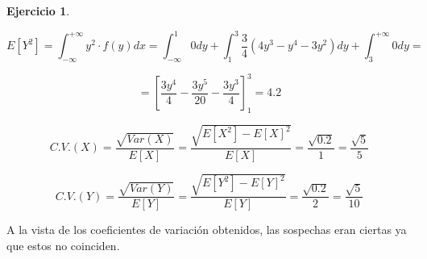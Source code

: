 \documentclass[a4paper, 12pt]{article}
\theoremstyle{definition}
\newtheorem{ej}{Ejercicio}
\begin{document}
\begin{ej}
\begin{enumerate}
    \begin{equation*}
        E[Y^2] = \int_{-\infty}^{+\infty}y^2 \cdot f(y)dx = \int_{-\infty}^{1}0dy + \int_{1}^{3}\frac{3}{4} (4y^3-y^4-3y^2)dy + \int_{3}^{+\infty}0dy =
    \end{equation*}
    
    \begin{equation*}
        = \left[\frac{3y^4}{4}-\frac{3y^5}{20}-\frac{3y^3}{4}\right]^{3}_{1} = 4.2
    \end{equation*}
    
    \begin{equation*}
        C.V.(X)=\frac{\sqrt{Var(X)}}{E[X]} = \frac{\sqrt{E[X^2]-E[X]^2}}{E[X]} = \frac{\sqrt{0.2}}{1} = \frac{\sqrt{5}}{5}
    \end{equation*}
    
    \begin{equation*}
        C.V.(Y)=\frac{\sqrt{Var(Y)}}{E[Y]} = \frac{\sqrt{E[Y^2]-E[Y]^2}}{E[Y]} = \frac{\sqrt{0.2}}{2} = \frac{\sqrt{5}}{10}
    \end{equation*}

A la vista de los coeficientes de variación obtenidos, las sospechas eran ciertas ya que estos no coinciden.
\end{enumerate}
\end{ej}
\end{document}
